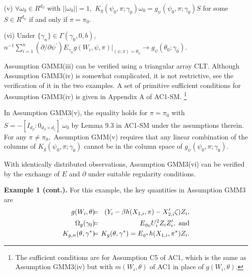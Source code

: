 \documentclass[12pt,thmsb,titlepage,final,oneside,letterpaper]{article}
\begin{document}
\noindent (v) $\forall \omega _{0}\in R^{d_{\beta }}$ with $||\omega
_{0}||=1,$ $K_{g}(\psi _{0},\pi ;\gamma _{0})\omega _{0}=g_{\psi }(\psi
_{0},\pi ;\gamma _{0})S$ for some $S\in R^{d_{\psi }}$ if and only if $\pi
=\pi _{0}.$

\noindent (vi) Under $\{\gamma _{n}\}\in \Gamma (\gamma _{0},0,b),$ $%
n^{-1}\sum_{i=1}^{n}(\partial /\partial \psi ^{\prime })E_{\gamma
_{n}}g(W_{i},\psi ,\pi )|_{(\psi ,\pi )=\theta _{n}}\rightarrow g_{\psi
}(\theta _{0};\gamma _{0}).$\medskip

Assumption GMM3(iii) can be verified using a triangular array CLT. Although
Assumption GMM3(iv) is somewhat complicated, it is not restrictive, see the
verification of it in the two examples. A set of primitive sufficient
conditions for Assumption GMM3(iv) is given in Appendix A of AC1-SM.%
\footnote{%
The sufficient conditions are for Assumption C5 of AC1, which is the same as
Assumption GMM3(iv) but with $m(W_{i},\theta )$ of AC1 in place of $%
g(W_{i},\theta ).$}

In Assumption GMM3(v), the equality holds for $\pi =\pi _{0}$ with $%
S=-[I_{d_{\beta }}:0_{d_{\beta }\times d_{\zeta }}]^{\prime }\omega _{0}$ by
Lemma 9.3 in AC1-SM under the assumptions therein. For any $\pi \neq \pi
_{0},$ Assumption GMM(v) requires that any linear combination of the columns
of $K_{g}(\psi _{0},\pi ;\gamma _{0})$ cannot be in the column space of $%
g_{\psi }(\psi _{0},\pi ;\gamma _{0}).$

With identically distributed observations, Assumption GMM3(vi) can be
verified by the exchange of $E$ and $\partial $ under suitable regularity
conditions.\medskip

\noindent \textbf{Example 1 (cont.). }For this example, the key quantities
in Assumption GMM3 are%
\begin{eqnarray}
g(W_{i},\theta )\hspace{-0.08in} &=&\hspace{-0.08in}(Y_{i}-\beta
h(X_{1,i},\pi )-X_{2,i}^{\prime }\zeta )Z_{i},  \notag \\
\Omega _{g}(\gamma _{0})\hspace{-0.08in} &=&\hspace{-0.08in}E_{\phi
_{0}}U_{i}^{2}Z_{i}Z_{i}^{\prime },\text{ and}  \notag \\
K_{g,n}(\theta ,\gamma ^{\ast })\hspace{-0.08in} &=&\hspace{-0.08in}%
K_{g}(\theta ,\gamma ^{\ast })=E_{\phi ^{\ast }}h(X_{1,i},\pi ^{\ast })Z_{i}.
\label{GMM3_key quant}
\end{eqnarray}
\end{document}
